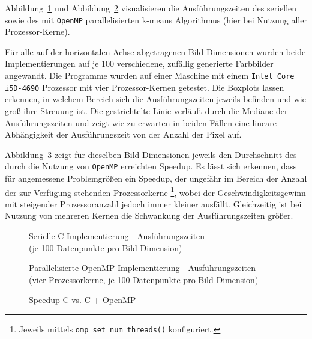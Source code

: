 \documentclass[
    bibliography=totoc, cd=lightcolor, cdmath=false, ngerman]{tudscrreprt}
\begin{document}
Abbildung~\ref{img:cboxplot} und Abbildung~\ref{img:ompboxplot} visualisieren
die Ausführungszeiten des seriellen sowie des mit \texttt{OpenMP}
parallelisierten k-means Algorithmus (hier bei Nutzung aller Prozessor-Kerne).

Für alle auf der horizontalen Achse abgetragenen Bild-Dimensionen wurden beide
Implementierungen auf je 100 verschiedene, zufällig generierte Farbbilder
angewandt. Die Programme wurden auf einer Maschine mit einem \texttt{Intel Core
i5D-4690} Prozessor mit vier Prozessor-Kernen getestet. Die Boxplots lassen
erkennen, in welchem Bereich sich die Ausführungszeiten jeweils befinden und
wie groß ihre Streuung ist. Die gestrichtelte Linie verläuft durch die Mediane
der Ausführungszeiten und zeigt wie zu erwarten in beiden Fällen eine lineare
Abhängigkeit der Ausführungszeit von der Anzahl der Pixel auf.

Abbildung~\ref{img:compspeedup} zeigt für dieselben Bild-Dimensionen jeweils
den Durchschnitt des durch die Nutzung von \texttt{OpenMP} erreichten Speedup.
Es lässt sich erkennen, dass für angemessene Problemgrößen ein Speedup, der
ungefähr im Bereich der Anzahl der zur Verfügung stehenden Prozessorkerne
\footnote{Jeweils mittels \texttt{omp\_set\_num\_threads()} konfiguriert.},
wobei der Geschwindigkeitsgewinn mit steigender Prozessoranzahl jedoch immer
kleiner ausfällt. Gleichzeitig ist bei Nutzung von mehreren Kernen die
Schwankung der Ausführungszeiten größer.

\begin{figure}[htbp]
  \centering
    
  \caption{Serielle C Implementierung - Ausführungszeiten \\
           (je 100 Datenpunkte pro Bild-Dimension)}
  \label{img:cboxplot}
\end{figure}

\begin{figure}[htbp]
  \centering
    
  \caption{Parallelisierte OpenMP Implementierung - Ausführungszeiten \\
           (vier Prozessorkerne, je 100 Datenpunkte pro Bild-Dimension)}
  \label{img:ompboxplot}
\end{figure}

\begin{figure}[htbp]
  \centering
    
  \caption{Speedup C vs. C + OpenMP}
  \label{img:compspeedup}
\end{figure}
\end{document}
